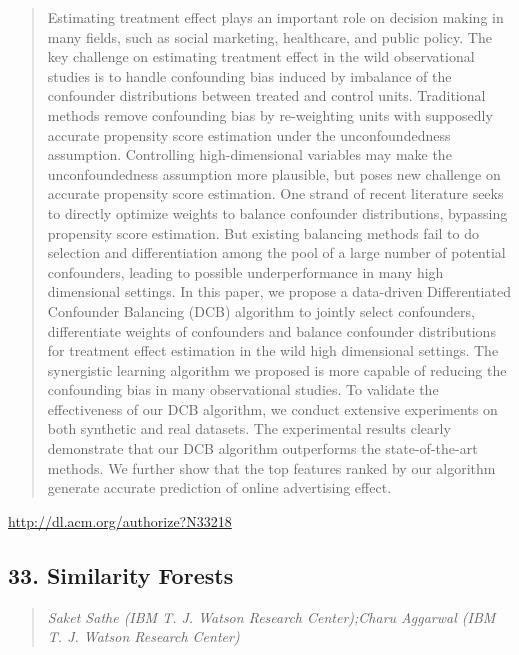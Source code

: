 \documentclass{article}
\begin{document}
\begin{quote}
Estimating treatment effect plays an important role on decision making in many fields, such as social marketing, healthcare, and public policy. The key challenge on estimating treatment effect in the wild observational studies is to handle confounding bias induced by imbalance of the confounder distributions between treated and control units. Traditional methods remove confounding bias by re-weighting units with supposedly accurate propensity score estimation under the unconfoundedness assumption. Controlling high-dimensional variables may make the unconfoundedness assumption more plausible, but poses new challenge on accurate propensity score estimation. One strand of recent literature seeks to directly optimize weights to balance confounder distributions, bypassing propensity score estimation. But existing balancing methods fail to do selection and differentiation among the pool of a large number of potential confounders, leading to possible underperformance in many high dimensional settings. In this paper, we propose a data-driven Differentiated Confounder Balancing (DCB) algorithm to jointly select confounders, differentiate weights of confounders and balance confounder distributions for treatment effect estimation in the wild high dimensional settings. The synergistic learning algorithm we proposed is more capable of reducing the confounding bias in many observational studies. To validate the effectiveness of our DCB algorithm, we conduct extensive experiments on both synthetic and real datasets. The experimental results clearly demonstrate that our DCB algorithm outperforms the state-of-the-art methods. We further show that the top features ranked by our algorithm generate accurate prediction of online advertising effect.
\end{quote}

\href{http://dl.acm.org/authorize?N33218}{http://dl.acm.org/authorize?N33218}

\subsection{33. Similarity Forests}

\begin{quote}
\footnotesize{\textit{Saket Sathe (IBM T. J. Watson Research Center);Charu Aggarwal (IBM T. J. Watson Research Center)}}

\end{quote}
\end{document}
